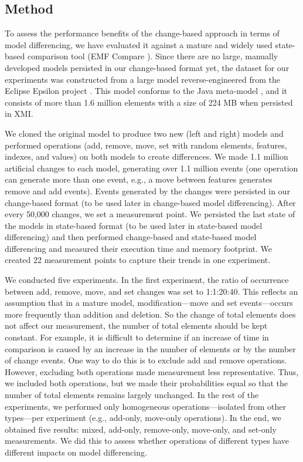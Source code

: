 \subsection{Method}
\label{sec:method}
To assess the performance benefits of the change-based approach in terms of model differencing, we have evaluated it against a mature and widely used state-based comparison tool (EMF Compare \cite{emfcompare2018developer, eclipse2017compare}). Since there are no large, manually developed models persisted in our change-based format yet, the dataset for our experiments was constructed from a large model reverse-engineered from the Eclipse Epsilon project \cite{eclipse2018epsilongit, eclipse2017epsilon}. This model conforms to the Java meta-model \cite{eclipse2018modiscojava}, and it consists of more than 1.6 million elements with a size of 224 MB when persisted in XMI.

We cloned the original model to produce two new (left and right) models and performed operations (\textsf{add}, \textsf{remove}, \textsf{move}, \textsf{set} with random elements, features, indexes, and values) on both models to create differences. We made 1.1 million artificial changes to each model, generating over 1.1 million events (one operation can generate more than one event, e.g., a \textsf{move} between features generates \textsf{remove} and \textsf{add} events). Events generated by the changes were persisted in our change-based format (to be used later in change-based model differencing). After every 50,000 changes, we set a measurement point. We persisted the last state of the models in state-based format (to be used later in state-based model differencing) and then performed change-based and state-based model differencing and measured their execution time and memory footprint. We created 22 measurement points to capture their trends in one experiment.

We conducted five experiments. In the first experiment, the ratio of occurrence between \textsf{add}, \textsf{remove}, \textsf{move}, and \textsf{set} changes was set to 1:1:20:40. This reflects an assumption that in a mature model, modification—\textsf{move} and \textsf{set} events—occurs more frequently than addition and deletion. So the change of total elements does not affect our measurement, the number of total elements should be kept constant. For example, it is difficult to determine if an increase of time in comparison is caused by an increase in the number of elements or by the number of change events. One way to do this is to exclude \textsf{add} and \textsf{remove} operations. However, excluding both operations made measurement less representative. Thus, we included both operations, but we made their probabilities equal so that the number of total elements remains largely unchanged. 
In the rest of the experiments, we performed only homogeneous operations—isolated from other types—per experiment (e.g., add-only, move-only operations). In the end, we obtained five results: mixed, add-only, remove-only, move-only, and set-only measurements. We did this to assess whether operations of different types have different impacts on model differencing.

